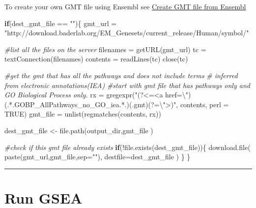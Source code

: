 \documentclass[
]{book}
\newenvironment{Shaded}{\begin{snugshade}}{\end{snugshade}}
\newcommand{\AttributeTok}[1]{\textcolor[rgb]{0.77,0.63,0.00}{#1}}
\newcommand{\CommentTok}[1]{\textcolor[rgb]{0.56,0.35,0.01}{\textit{#1}}}
\newcommand{\ConstantTok}[1]{\textcolor[rgb]{0.00,0.00,0.00}{#1}}
\newcommand{\ControlFlowTok}[1]{\textcolor[rgb]{0.13,0.29,0.53}{\textbf{#1}}}
\newcommand{\FunctionTok}[1]{\textcolor[rgb]{0.00,0.00,0.00}{#1}}
\newcommand{\NormalTok}[1]{#1}
\newcommand{\OtherTok}[1]{\textcolor[rgb]{0.56,0.35,0.01}{#1}}
\newcommand{\SpecialCharTok}[1]{\textcolor[rgb]{0.00,0.00,0.00}{#1}}
\newcommand{\StringTok}[1]{\textcolor[rgb]{0.31,0.60,0.02}{#1}}
\begin{document}
To create your own GMT file using Ensembl see \protect\hyperlink{create-gmt-file-from-ensembl}{Create GMT file from Ensembl}

\begin{Shaded}
\begin{Highlighting}[]
\ControlFlowTok{if}\NormalTok{(dest\_gmt\_file }\SpecialCharTok{==} \StringTok{""}\NormalTok{)\{}
\NormalTok{  gmt\_url }\OtherTok{=} \StringTok{"http://download.baderlab.org/EM\_Genesets/current\_release/Human/symbol/"}
  
  \CommentTok{\#list all the files on the server}
\NormalTok{  filenames }\OtherTok{=} \FunctionTok{getURL}\NormalTok{(gmt\_url)}
\NormalTok{  tc }\OtherTok{=} \FunctionTok{textConnection}\NormalTok{(filenames)}
\NormalTok{  contents }\OtherTok{=} \FunctionTok{readLines}\NormalTok{(tc)}
  \FunctionTok{close}\NormalTok{(tc)}
  
  \CommentTok{\#get the gmt that has all the pathways and does not include terms }
  \CommentTok{\# inferred from electronic annotations(IEA)}
  \CommentTok{\#start with gmt file that has pathways only and GO Biological Process only.}
\NormalTok{  rx }\OtherTok{=} \FunctionTok{gregexpr}\NormalTok{(}\StringTok{"(?\textless{}=\textless{}a href=}\SpecialCharTok{\textbackslash{}"}\StringTok{)(.*.GOBP\_AllPathways\_no\_GO\_iea.*.)(.gmt)(?=}\SpecialCharTok{\textbackslash{}"}\StringTok{\textgreater{})"}\NormalTok{,}
\NormalTok{    contents, }\AttributeTok{perl =} \ConstantTok{TRUE}\NormalTok{)}
\NormalTok{  gmt\_file }\OtherTok{=} \FunctionTok{unlist}\NormalTok{(}\FunctionTok{regmatches}\NormalTok{(contents, rx))}
  
\NormalTok{  dest\_gmt\_file }\OtherTok{\textless{}{-}} \FunctionTok{file.path}\NormalTok{(output\_dir,gmt\_file )}
  
  \CommentTok{\#check if this gmt file already exists}
  \ControlFlowTok{if}\NormalTok{(}\SpecialCharTok{!}\FunctionTok{file.exists}\NormalTok{(dest\_gmt\_file))\{}
    \FunctionTok{download.file}\NormalTok{(}
      \FunctionTok{paste}\NormalTok{(gmt\_url,gmt\_file,}\AttributeTok{sep=}\StringTok{""}\NormalTok{),}
      \AttributeTok{destfile=}\NormalTok{dest\_gmt\_file}
\NormalTok{    )}
\NormalTok{  \}}
\NormalTok{\}}
\end{Highlighting}
\end{Shaded}

\begin{center}\rule{0.5\linewidth}{0.5pt}\end{center}

\hypertarget{run-gsea}{%
\section{Run GSEA}\label{run-gsea}}
\end{document}
